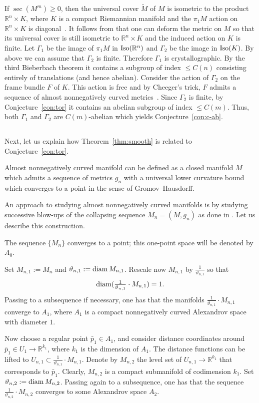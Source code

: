 \documentclass{amsart}
\begin{document}
If $\sec(M^m)\ge0$, then the universal cover $\tilde M$ of $M$ is isometric to the product $\mathbb{R}^n\times K$, where $K$ is a compact Riemannian manifold and the $\pi_1M$ action  on $\mathbb{R}^n\times K$ is diagonal~\cite{CG72}.
It follows from \cite[Cor. 6.3]{wilking} that one can deform the metric on $M$ so that its universal cover is still isometric to $\mathbb{R}^n\times K$ and the induced action on $K$ is finite. Let $\Gamma_1$ be the image of $\pi_1M$ in 
$\mathop{\rm Iso}(\mathbb{R}^n)$ and $\Gamma_2$ be the image in $\mathop{\rm Iso}(K)$. By above we can assume that $\Gamma_2$ is finite. Therefore $\Gamma_1$ is crystallographic. By the third Bieberbach theorem it contains a subgroup of index $\le C(n)$ consisting entirely of translations (and hence abelian).
Consider the action of $\Gamma_2$ on the frame bundle $F$ of $K$. This action is free and by Cheeger's trick, $F$ admits a sequence of almost nonnegatively curved metrics~\cite{FY}. Since $\Gamma_2$ is finite, by Conjecture~\ref{con:tor} it contains 
an abelian subgroup of index $\le C(m)$. Thus, both $\Gamma_1$ and $\Gamma_2$ are $C(m)$-abelian which  yields Conjecture~\ref{con:c-ab}.

\subsection{} Next, let us explain  how Theorem~\ref{thm:smooth} is related to Conjecture~\ref{con:tor}.

Almost nonnegatively curved manifold can be defined as a closed manifold $M$ which admits a sequence of metrics $g_n$ with a universal lower curvature bound which converges to a point in the sense of Gromov--Hausdorff.

An approach to studying almost nonnegatively curved manifolds is by studying successive blow-ups of the collapsing sequence $M_n=(M,g_n)$ as done in \cite[Section 4.3]{KPT}.
Let us describe this construction.

The sequence $\{M_n\}$ converges to a point; this one-point space will be denoted by $A_0$.

Set $M_{n,1}:=M_n$ and $\vartheta_{n,1}:=\operatorname{\rm diam} M_{n,1}$.
Rescale now $M_{n,1}$ by $\tfrac{1}{\vartheta_{n,1}}$
so that 
\[\operatorname{\rm diam}(\tfrac{1}{\vartheta_{n,1}}\cdot M_{n,1})=1.\]
Passing to a subsequence if necessary, one has
that the manifolds $\frac{1}{\vartheta_{n,1}}{\cdot} M_{n,1}$
converge to $A_1$,
where $A_1$
is a compact nonnegatively curved Alexandrov space with diameter $1$.

Now choose a regular point $\bar p_1\in A_1$,
and consider distance coordinates around $\bar p_1\in U_1\to \mathbb{R}^{k_1}$,
where $k_1$ is the dimension of $A_1$.
The distance functions can be lifted
to $U_{n,1}\subset \frac{1}{\vartheta_{n,1}}{\cdot} M_{n,1}$.
Denote by $M_{n,2}$ the level set of $U_{n,1}\to \mathbb{R}^{k_1}$ that corresponds to $\bar p_1$.
Clearly, $M_{n,2}$ is a compact submanifold of codimension $k_1$.
Set $\vartheta_{n,2}:=\operatorname{\rm diam} M_{n,2}$.
Passing again to a subsequence, one has
that the sequence $\frac{1}{\vartheta_{n,2}}{\cdot} M_{n,2}$
converges to some  Alexandrov space $A_2$.
\end{document}
